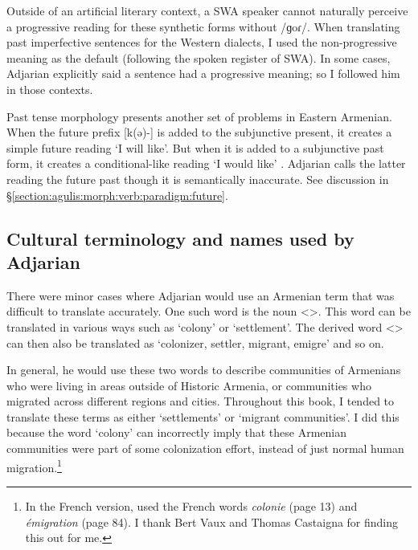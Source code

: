 \documentclass[output=paper]{langscibook}
\begin{document}
Outside of an artificial literary context, a SWA speaker cannot naturally perceive a progressive reading for these synthetic forms without /ɡoɾ/. When translating past imperfective sentences for the Western dialects, I used the non\hyp progressive meaning as the default (following the spoken register of SWA).  In some cases, Adjarian explicitly said a sentence had a progressive meaning; so I followed him in those contexts.


Past tense morphology presents another set of problems in Eastern Armenian. When the future prefix [k(ə)-] is added to the subjunctive present, it creates a simple future reading `I will like'. But when it is added to a subjunctive past form, it creates a conditional-like reading `I would like' \citep[\S6.5.3]{DolatianEtAl-prep-IranianGrammar}.   Adjarian calls the latter reading the future past though it is semantically inaccurate. See discussion in \S\ref{section:agulis:morph:verb:paradigm:future}. 
 

 
\subsection{Cultural terminology and names used by Adjarian}\label{sec:HossepIntro:translation:name}

There were minor cases where Adjarian would use an Armenian term that was difficult to translate accurately. One such word is the noun <>. This word can be translated in various ways such as `colony' or `settlement'. The derived word <> can then also be translated as `colonizer, settler, migrant, emigre' and so on.

In general, he would use these two words to describe communities of Armenians who were living in areas outside of Historic Armenia, or communities who migrated across different regions and cities. Throughout this book, I tended to translate these terms as either   `settlements' or `migrant communities'. I did this because the word `colony' can incorrectly imply that these Armenian communities were part of some colonization effort, instead of just normal human migration.\footnote{In the French version, \citet{Adjarian-1909-ClassificationArmenianDialect} used the French words \textit{colonie} (page 13) and \textit{émigration} (page 84).  I thank Bert Vaux and Thomas Castaigna for finding this out for me.}
\end{document}
